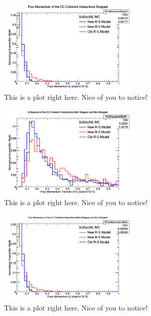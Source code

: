 \documentclass[11pt]{article}
\begin{document}
\begin{figure}[H]
\centering
\includegraphics[width=0.6\textwidth]{NMFourSquaredPlottingImages/4-NMFourSquaredPlotting.png}
\caption{This is a plot right here. Nice of you to notice!}
\end{figure}

\begin{figure}[H]
\centering
\includegraphics[width=0.6\textwidth]{NMFourSquaredPlottingImages/5-NMFourSquaredPlotting.png}
\caption{This is a plot right here. Nice of you to notice!}
\end{figure}

\begin{figure}[H]
\centering
\includegraphics[width=0.6\textwidth]{NMFourSquaredPlottingImages/6-NMFourSquaredPlotting.png}
\caption{This is a plot right here. Nice of you to notice!}
\end{figure}

\end{document}
